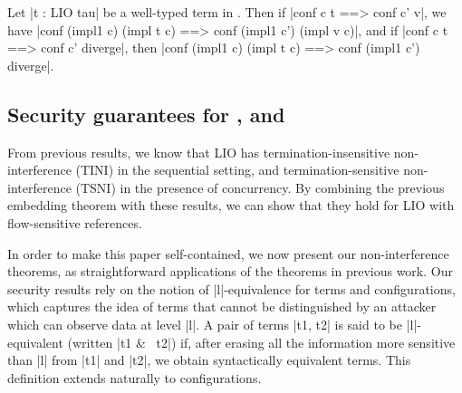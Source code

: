 


\begin{theorem}\label{thm:eq} Let |t : LIO tau| be a well-typed term in \liofs{}.
  Then if |conf c t ==> conf c' v|, we have |conf (impl1 c) (impl t c)
  ==> conf (impl1 c') (impl v c)|, and if 
  |conf c t ==> conf c' diverge|, then
  |conf (impl1 c) (impl t c) ==> conf (impl1 c') diverge|.
\end{theorem}

\subsection{Security guarantees for \liofs{}, \lioafs{} and \lioconc{}}

From previous results, we know that LIO has termination-insensitive
non-interference (TINI) in the sequential setting, and termination-sensitive
non-interference (TSNI) in the presence of concurrency. By combining the previous
embedding theorem with these results, we can show that they hold for LIO with
flow-sensitive references.

In order to make this paper self-contained, we now present our
non-interference theorems, as straightforward applications of the theorems in
previous work. Our security results rely on the notion of
|l|-equivalence for terms and configurations, which captures the idea
of terms that cannot be distinguished by an attacker which can observe
data at level |l|. A pair of terms |t1, t2| is said to be
|l|-equivalent (written |t1 &~ t2|) if, after erasing all the
information more sensitive than |l| from |t1| and |t2|, we obtain
syntactically equivalent terms. This definition extends naturally to
configurations.

